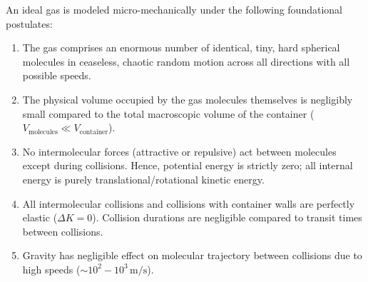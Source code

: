 \documentclass[10pt,a4paper]{article}
\begin{document}
\begin{conceptbox}
An ideal gas is modeled micro-mechanically under the following foundational postulates:
\begin{enumerate}
  \item The gas comprises an enormous number of identical, tiny, hard spherical molecules in ceaseless, chaotic random motion across all directions with all possible speeds.
  \item The physical volume occupied by the gas molecules themselves is negligibly small compared to the total macroscopic volume of the container ($V_{\text{molecules}} \ll V_{\text{container}}$).
  \item No intermolecular forces (attractive or repulsive) act between molecules except during collisions. Hence, potential energy is strictly zero; all internal energy is purely translational/rotational kinetic energy.
  \item All intermolecular collisions and collisions with container walls are perfectly elastic ($\Delta K = 0$). Collision durations are negligible compared to transit times between collisions.
  \item Gravity has negligible effect on molecular trajectory between collisions due to high speeds ($\sim 10^2 - 10^3\,\mathrm{m/s}$).
\end{enumerate}
\end{conceptbox}
\end{document}
